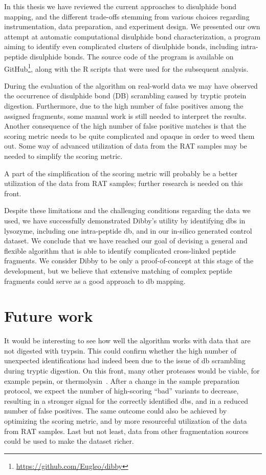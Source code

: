 
In this thesis we have reviewed the current approaches to disulphide bond mapping, and the different trade-offs stemming from various choices regarding instrumentation, data preparation, and experiment design. We presented our own attempt at automatic computational disulphide bond characterization, a program aiming to identify even complicated clusters of disulphide bonds, including intra-peptide disulphide bonds. The source code of the program is available on GitHub\footnote{\url{https://github.com/Eugleo/dibby}}, along with the R scripts that were used for the subsequent analysis.

During the evaluation of the algorithm on real-world data we may have observed the occurrence of disulphide bond (DB) scrambling caused by tryptic protein digestion. Furthermore, due to the high number of false positives among the assigned fragments, some manual work is still needed to interpret the results. Another consequence of the high number of false positive matches is that the scoring metric needs to be quite complicated and opaque in order to weed them out. Some way of advanced utilization of data from the RAT samples may be needed to simplify the scoring metric.

A part of the simplification of the scoring metric will probably be a better utilization of the data from RAT samples; further research is needed on this front.

Despite these limitations and the challenging conditions regarding the data we used, we have successfully demonstrated Dibby's utility by identifying \glspl*{db} in lysozyme, including one intra-peptide \gls*{db}, and in our in-silico generated control dataset. We conclude that we have reached our goal of devising a general and flexible algorithm that is able to identify complicated cross-linked peptide fragments. We consider Dibby to be only a proof-of-concept at this stage of the development, but we believe that extensive matching of complex peptide fragments could serve as a good approach to \gls*{db} mapping.

\section*{Future work}

It would be interesting to see how well the algorithm works with data that are not digested with trypsin. This could confirm whether the high number of unexpected identifications had indeed been due to the issue of \gls*{db} scrambling during tryptic digestion. On this front, many other proteases would be viable, for example pepsin, or thermolysin~\cite{sung2016evaluation}. After a change in the sample preparation protocol, we expect the number of high-scoring ``bad'' variants to decrease, resulting in a stronger signal for the correctly identified \glspl*{db}, and in a reduced number of false positives. The same outcome could also be achieved by optimizing the scoring metric, and by more resourceful utilization of the data from RAT samples. Last but not least, data from other fragmentation sources could be used to make the dataset richer.

